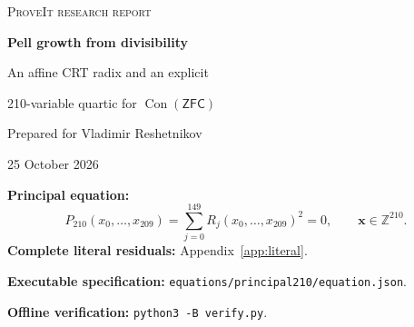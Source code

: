 \documentclass[11pt,a4paper]{article}
\theoremstyle{remark}\newtheorem{remark}[theorem]{Remark}
\newcommand{\Z}{\mathbb Z}
\newcommand{\Con}{\operatorname{Con}}
\newcommand{\ZFC}{\mathsf{ZFC}}
\begin{document}
\hypersetup{pageanchor=false}
\begin{titlepage}
\vspace*{1.4cm}
{\Large\scshape ProveIt research report\par}
\vspace{1.0cm}
{\huge\bfseries Pell growth from divisibility\par}
\vspace{0.35cm}
{\LARGE An affine CRT radix and an explicit\par 210-variable quartic for $\Con(\ZFC)$\par}
\vspace{0.8cm}
{\large Prepared for Vladimir Reshetnikov\par 25 October 2026\par}
\vspace{1.0cm}
\begin{abstract}
We construct a literal quartic polynomial in 210 unrestricted integer variables
whose non-solvability is equivalent, provably in ZFC, to the consistency of ZFC,
by composing new arithmetic reductions with the repository's identified
numerical-calculus calibration. The polynomial is a sum of 150 squares of
quadratic polynomials. Its collected expansion has 5,282 nonzero monomials and
coefficient height $2^{40}$. All coefficients and all 150 residuals are supplied.

The main change replaces an exact exponential-growth request by three
quadratic equations forcing the existing growth coordinate to be a sufficiently
large Pell ordinate. A normalized Pell permutation modulo powers of two makes
this replacement compatible with the odd binomial selector required for CRT.
The existing dominant CRT index also provides an affine radix base, removing
another coordinate. A delayed sign argument is essential: the new growth
ordinate is initially signed. The construction improves the incoming
213-variable quartic in variable count, number of residuals, support and
coefficient height. We also provide a 214-variable companion with much smaller
coefficients, and an independent 11-positive-variable, degree-174 companion.

These are explicit constructions and ordinary mathematical proofs, with exact
finite coefficient and reconstruction checks. No global minimum, historical
priority, fresh end-to-end Lean/Rocq build, or proof of consistency is claimed.
\end{abstract}
\vfill
\textbf{Principal equation:}
\[
P_{210}(x_0,\ldots,x_{209})=\sum_{j=0}^{149}R_j(x_0,\ldots,x_{209})^2=0,
\qquad \boldsymbol x\in\Z^{210}.
\]
\textbf{Complete literal residuals:} Appendix~\ref{app:literal}.\par
\textbf{Executable specification:} \texttt{equations/principal210/equation.json}.\par
\textbf{Offline verification:} \texttt{python3 -B verify.py}.
\end{titlepage}
\hypersetup{pageanchor=true}
\tableofcontents
\clearpage
{}
\end{document}
